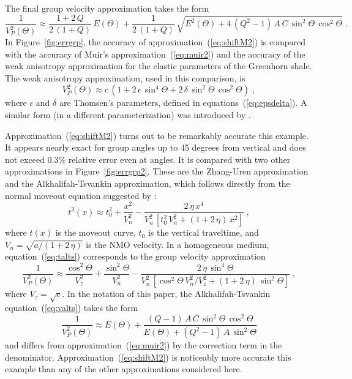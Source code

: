 The final group velocity approximation takes the form
\begin{equation}
  \label{eq:shiftM2}
  \frac{1}{V^2_{P}(\Theta)} \approx \frac{1+2\,Q}{2\,(1+Q)}\,E(\Theta) + 
\frac{1}{2\,(1+Q)}\,
\sqrt{E^2(\Theta) + 4\,(Q^2-1)\,A\,C\,\sin^2{\Theta}\,\cos^2{\Theta}}\;.
\end{equation}
In Figure~\ref{fig:errgrp}, the accuracy of approximation~(\ref{eq:shiftM2})
is compared with the accuracy of Muir's approximation~(\ref{eq:muir2}) and the
accuracy of the weak anisotropy approximation \cite[]{GEO51-10-19541966} for the
elastic parameters of the Greenhorn shale. The weak anisotropy approximation,
used in this comparison, is
\begin{equation}
  \label{eq:thoms2}
  V_P^2(\Theta) \approx c\,\left(1 + 2\,\epsilon\,\sin^4{\Theta} + 
    2\,\delta\,\sin^2{\Theta}\,\cos^2{\Theta}\right)\;,
\end{equation}
where $\epsilon$ and $\delta$ are Thomsen's parameters, defined in
equations~(\ref{eq:epsdelta}). A similar form (in a different
parameterization) was introduced by \cite{GEO54-12-15641574}.

Approximation~(\ref{eq:shiftM2}) turns out to be remarkably accurate
 this example. It appears nearly exact for group angles up to 45
degrees from vertical and does not exceed 0.3\% relative error even at
 angles. It is compared with two other approximations in
Figure~\ref{fig:errgrp2}. These are the Zhang-Uren approximation
\cite[]{SEG-2001-01060109} and the Alkhalifah-Tsvankin approximation, which
follows directly from the normal moveout equation suggested by
\cite{GEO60-05-15501566}:
\begin{equation}
  \label{eq:talts}
  t^2(x) \approx t_0^2 + \frac{x^2}{V_n^2} - 
  \frac{2\,\eta\,x^4}{V_n^2\,\left[t_0^2\,V_n^2 + (1+ 2\,\eta)\,x^2\right]}
\;,
\end{equation}
where $t(x)$ is the moveout curve, $t_0$ is the vertical traveltime, and $V_n
= \sqrt{a/(1 + 2\,\eta)}$ is the NMO velocity. In a homogeneous medium,
equation~(\ref{eq:talts}) corresponds to the group velocity approximation
\begin{equation}
  \label{eq:valts}
  \frac{1}{V_P^2(\Theta)} \approx \frac{\cos^2{\Theta}}{V_z^2} + 
  \frac{\sin^2{\Theta}}
  {V_n^2} - \frac{2\,\eta\,\sin^4{\Theta}}
  {V_n^2\,\left[\cos^2{\Theta}\,V_n^2/V_z^2 + 
  (1+ 2\,\eta)\,\sin^2{\Theta}\right]}
\;,
\end{equation}
where $V_z = \sqrt{c}$. In the notation of this paper, the Alkhalifah-Tsvankin
equation~(\ref{eq:valts}) takes the form
\begin{equation}
  \label{eq:valts2}
  \frac{1}{V_P^2(\Theta)} \approx E(\Theta) + 
  \frac{(Q-1)\,A\,C\,
    \sin^2{\Theta}\,\cos^2{\Theta}}{E(\Theta) + (Q^2-1)\,A\,\sin^2{\Theta}}
\end{equation}
and differs from approximation~(\ref{eq:muir2}) by the correction term in the
denominator. Approximation~(\ref{eq:shiftM2}) is noticeably more accurate
 this example than any of the other approximations considered here.

